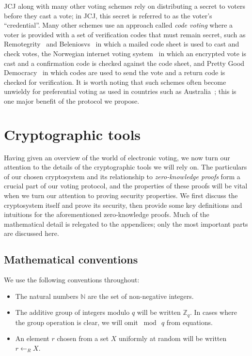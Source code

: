 \documentclass[12pt,a4paper]{article}
\theoremstyle{definition}
\begin{document}
JCJ along with many other voting schemes rely on distributing a secret to voters before they cast a vote; in JCJ, this secret is referred to as the voter's ``credential''. Many other schemes use an approach called \textit{code voting} where a voter is provided with a set of verification codes that must remain secret, such as Remotegrity~\cite{zagorski2013remotegrity} and Beleniosvs~\cite{cortier2019beleniosvs} in which a mailed code sheet is used to cast and check votes, the Norwegian internet voting system~\cite{gjosteen2011norwegian} in which an encrypted vote is cast and a confirmation code is checked against the code sheet, and Pretty Good Democracy~\cite{ryan2009pretty} in which codes are used to send the vote and a return code is checked for verification. It is worth noting that such schemes often become unwieldy for preferential voting as used in countries such as Australia~\cite{aditya2003secure}; this is one major benefit of the protocol we propose.


\section{Cryptographic tools}\label{sec-crypto}
Having given an overview of the world of electronic voting, we now turn our attention to the details of the cryptographic tools we will rely on. The particulars of our chosen cryptosystem and its relationship to \textit{zero-knowledge proofs} form a crucial part of our voting protocol, and the properties of these proofs will be vital when we turn our attention to proving security properties. We first discuss the cryptosystem itself and prove its security, then provide some key definitions and intuitions for the aforementioned zero-knowledge proofs. Much of the mathematical detail is relegated to the appendices; only the most important parts are discussed here.

\subsection{Mathematical conventions}
We use the following conventions throughout:
\begin{itemize}
    \item The natural numbers $\mathbb{N}$ are the set of non-negative integers.
    \item The additive group of integers modulo $q$ will be written $\mathbb{Z}_q$. In cases where the group operation is clear, we will omit $\bmod\ q$ from equations.
    \item An element $r$ chosen from a set $X$ uniformly at random will be written $r\gets_R X$.
\end{itemize}
\end{document}
